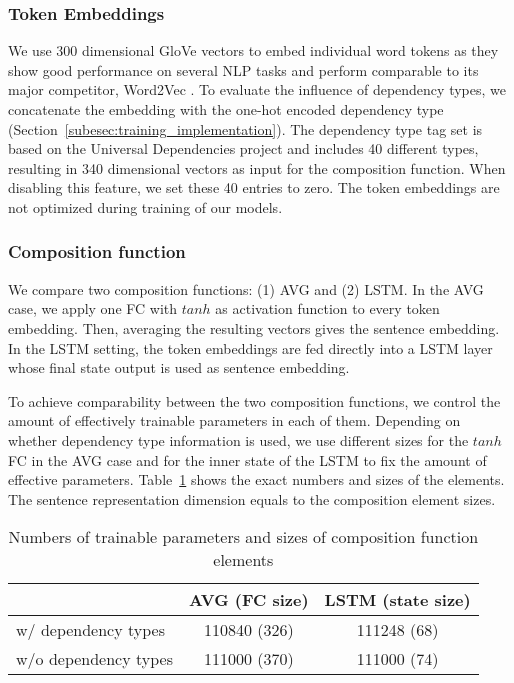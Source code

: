 \subsubsection{Token Embeddings}
We use 300 dimensional  GloVe vectors \autocite{pennington_glove_2014} to embed individual word tokens as they show good performance on several \ac{NLP} tasks and perform comparable to its major competitor, Word2Vec \autocite{levy_improving_2015,naili_comparative_2017}. To evaluate the influence of dependency types, we concatenate the embedding with the one-hot encoded dependency type (Section~\ref{subesec:training_implementation}). The dependency type tag set is based on the Universal Dependencies project \autocite{nivre_universal_2016} and includes 40 different types, resulting in 340 dimensional vectors as input for the composition function. When disabling this feature, we set these 40 entries to zero. The token embeddings are not optimized during training of our models.   

\subsubsection{Composition function}
We compare two composition functions: (1) \acf{AVG} and (2) \acf{LSTM}. 
In the \ac{AVG} case, we apply one \acf{FC} with $tanh$ as activation function to every token embedding. Then, averaging the resulting vectors gives the sentence embedding.
In the \ac{LSTM} setting, the token embeddings are fed directly into a LSTM layer whose final state  output is used as sentence embedding. %

To achieve comparability between the two composition functions, we control the amount of effectively trainable parameters in each of them. Depending on whether dependency type information is used, we use different sizes for the $tanh$ \ac{FC} in the \ac{AVG} case and for the inner state of the \ac{LSTM} to fix the amount of effective parameters. Table~\ref{tab:sizes} shows the exact numbers and sizes of the elements. The sentence representation dimension equals to the composition element sizes.  %

\begin{table}[!htb]
  \centering
  \begin{tabular}{ l | c | c }
      & AVG (FC size) & LSTM (state size) \\ \hline
    w/ dependency types & 110840 (326) & 111248 (68) \\ 
    w/o dependency types & 111000 (370) & 111000 (74) \\
  \end{tabular}
  \caption{Numbers of trainable parameters and sizes of composition function elements}
  \label{tab:sizes}
\end{table}

